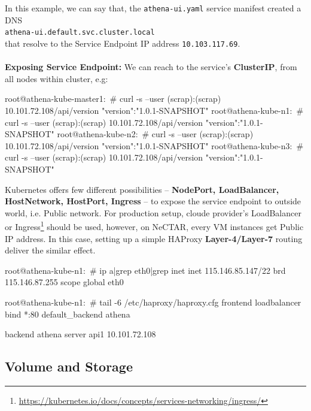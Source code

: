 \noindent In this example, we can say that, the \verb|athena-ui.yaml| service manifest created a DNS
\\
\verb|athena-ui.default.svc.cluster.local|
\\
that resolve to the Service Endpoint IP address \verb|10.103.117.69|.
\\
\\
\noindent \textbf{Exposing Service Endpoint:} \quad We can reach to the service's \textbf{ClusterIP}, from all nodes within cluster, e.g:

\begin{small}
\begin{lcverbatim}
root@athena-kube-master1:~# curl -s --user (scrap):(scrap) 10.101.72.108/api/version
{"version":"1.0.1-SNAPSHOT"}
root@athena-kube-n1:~# curl -s --user (scrap):(scrap) 10.101.72.108/api/version
{"version":"1.0.1-SNAPSHOT"}
root@athena-kube-n2:~# curl -s --user (scrap):(scrap) 10.101.72.108/api/version
{"version":"1.0.1-SNAPSHOT"}
root@athena-kube-n3:~# curl -s --user (scrap):(scrap) 10.101.72.108/api/version
{"version":"1.0.1-SNAPSHOT"}
\end{lcverbatim}
\end{small}

\noindent Kubernetes offers few different possibilities -- \textbf{NodePort, LoadBalancer, HostNetwork, HostPort, Ingress} -- to expose the service endpoint to outside world, i.e. Public network. For production setup, cloude provider's LoadBalancer or Ingress\footnote{\url{https://kubernetes.io/docs/concepts/services-networking/ingress/}} should be used, however, on NeCTAR, every VM instances get Public IP address. In this case, setting up a simple HAProxy \textbf{Layer-4/Layer-7} routing deliver the similar effect.

\begin{small}
\begin{lcverbatim}
root@athena-kube-n1:~# ip a|grep eth0|grep inet
    inet 115.146.85.147/22 brd 115.146.87.255 scope global eth0

root@athena-kube-n1:~# tail -6 /etc/haproxy/haproxy.cfg
frontend loadbalancer
	bind *:80
	default_backend athena

backend athena
	server api1 10.101.72.108
\end{lcverbatim}
\end{small}

\subsection{Volume and Storage}

